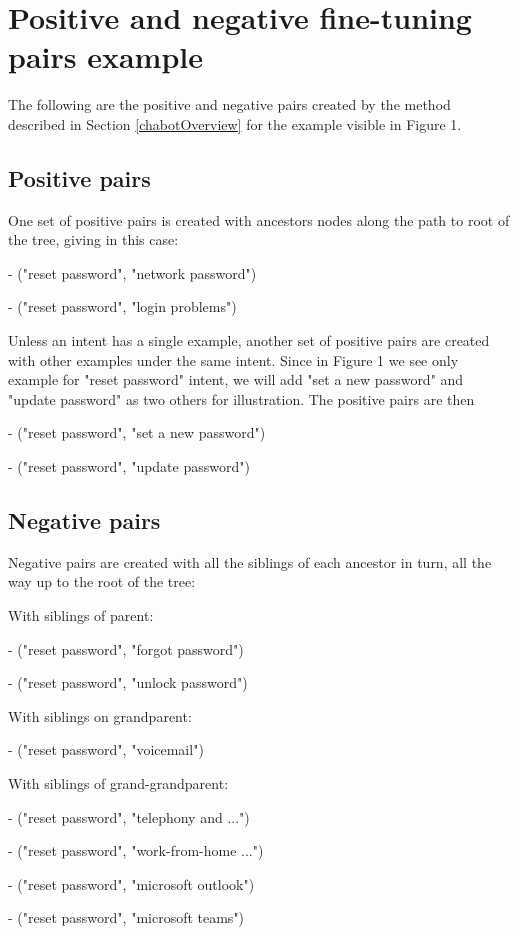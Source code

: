 \documentclass[sigconf, anonymous=true]{acmart}
\begin{document}
\section{Positive and negative fine-tuning pairs example}
\label{sec:posNegPairsExamples}

The following are the positive and negative pairs created by the method described in Section \ref{chabotOverview} for the example visible in Figure 1.

\subsection{Positive pairs}
One set of positive pairs is created with ancestors nodes along the path to root of the tree, giving in this case:

- ("reset password", "network password")

- ("reset password", "login problems")

Unless an intent has a single example, another set of positive pairs are created with other examples under the same intent. Since in Figure 1 we see only example for "reset password" intent, we will add "set a new password" and "update password" as two others for illustration. The positive pairs are then

- ("reset password", "set a new password")

- ("reset password", "update password")


\subsection{Negative pairs}
Negative pairs are created with all the siblings of each ancestor in turn, all the way up to the root of the tree:

With siblings of parent:

- ("reset password", "forgot password")

- ("reset password", "unlock password")

With siblings on grandparent:

- ("reset password", "voicemail")

With siblings of grand-grandparent:

- ("reset password", "telephony and ...")

- ("reset password", "work-from-home ...")

- ("reset password", "microsoft outlook")

- ("reset password", "microsoft teams")
\end{document}
